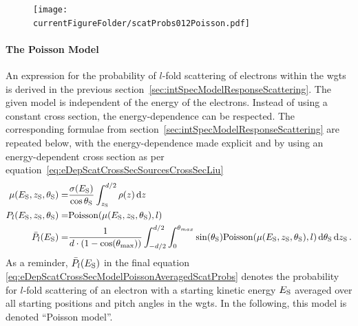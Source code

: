 \begin{figure}[th]
\texttt{[image: \\currentFigureFolder/scatProbs012Poisson.pdf]}
        \label{fig:eDepScatCrossSecModel}
\end{figure}

\paragraph{The Poisson Model}
An expression for the probability of $l$-fold scattering of electrons within the \gls{wgts} is derived in the previous section~\ref{sec:intSpecModelResponseScattering}. The given model is independent of the energy of the electrons. Instead of using a constant cross section, the energy-dependence can be respected. The corresponding formulae from section~\ref{sec:intSpecModelResponseScattering} are repeated below, with the energy-dependence made explicit and by using an energy-dependent cross section as per equation~\eqref{eq:eDepScatCrossSecSourcesCrossSecLiu}
\begin{subequations}
\label{eq:eDepScatCrossSecModelPoisson}
\begin{align}
    \mu(E_\mathrm{S},z_\mathrm{S},\theta_\mathrm{S}) =&
    \frac{\sigma(E_\mathrm{S})}{\cos\theta_\mathrm{S}}
    \int_{z_\mathrm{S}}^{d/2} \rho(z)\mathop{}\!\mathrm{d} z \label{eq:energydepScatProbsPoissonExpectedScatCount} \\
    P_l(E_\mathrm{S},z_\mathrm{S},\theta_\mathrm{S}) =&
    \mathrm{Poisson}(\mu(E_\mathrm{S},z_\mathrm{S},\theta_\mathrm{S}),l) \label{eq:eDepScatCrossSecModelPoissonNonAveragedScatProbs} \\
    \bar{P}_l(E_\mathrm{S}) =&
    \frac{1}{d \cdot (1-\cos(\theta_\mathrm{max}))} 
      \int_{-d/2}^{d/2}  
          \int_{0}^{\theta_{max}} 
            \sin(\theta_\mathrm{S})
            \mathrm{Poisson}(\mu(E_\mathrm{S},z_\mathrm{S},\theta_\mathrm{S}),l)
          \mathop{}\!\mathrm{d}\theta_\mathrm{S}
      \mathop{}\!\mathrm{d}z_\mathrm{S}
      \label{eq:eDepScatCrossSecModelPoissonAveragedScatProbs}
    \text{\,.}
\end{align}
\end{subequations}
As a reminder, $\bar{P}_l(E_\mathrm{S})$ in the final equation \eqref{eq:eDepScatCrossSecModelPoissonAveragedScatProbs} denotes the probability for $l$-fold scattering of an electron with a starting kinetic energy $E_\mathrm{S}$ averaged over all starting positions and pitch angles in the \gls{wgts}. In the following, this model is denoted ``Poisson model''. 

